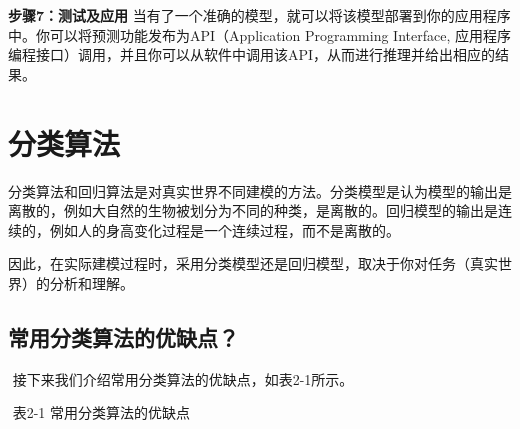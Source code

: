 \textbf{步骤7：测试及应用} ​
当有了一个准确的模型，就可以将该模型部署到你的应用程序中。你可以将预测功能发布为API（Application
Programming Interface,
应用程序编程接口）调用，并且你可以从软件中调用该API，从而进行推理并给出相应的结果。

\section{ 分类算法}\label{ux5206ux7c7bux7b97ux6cd5}

​
分类算法和回归算法是对真实世界不同建模的方法。分类模型是认为模型的输出是离散的，例如大自然的生物被划分为不同的种类，是离散的。回归模型的输出是连续的，例如人的身高变化过程是一个连续过程，而不是离散的。

​
因此，在实际建模过程时，采用分类模型还是回归模型，取决于你对任务（真实世界）的分析和理解。

\subsection{常用分类算法的优缺点？}\label{ux5e38ux7528ux5206ux7c7bux7b97ux6cd5ux7684ux4f18ux7f3aux70b9}

​ 接下来我们介绍常用分类算法的优缺点，如表2-1所示。

​ 表2-1 常用分类算法的优缺点

